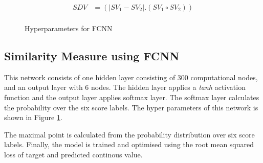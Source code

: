 \documentclass[12pt]{report} %
\begin{document}
		\begin{align*} 
			SDV & =(|SV_{1}- SV_{2}|.(SV_{1} \circ SV_{2})) \\
		\end{align*}
	
	\begin{figure}[hbp]
		\centering
		\caption{Hyperparameters for FCNN \cite{shao2017hcti}}
		\label{params}
	\end{figure}
	
	\subsection{Similarity Measure using FCNN}
	
	 This network consists of one hidden layer consisting of 300 computational nodes, and an output layer with 6 nodes. The hidden layer applies a \textit{tanh} activation function and the output layer applies softmax layer. The softmax layer calculates the probability over the six score labels. The hyper parameters of this network is shown in Figure \ref{params}.
	 
	 The maximal point is calculated from the probability distribution over six score labels. Finally, the model is trained and optimised using the root mean squared loss of target and predicted continous value. 
	 
\end{document}

